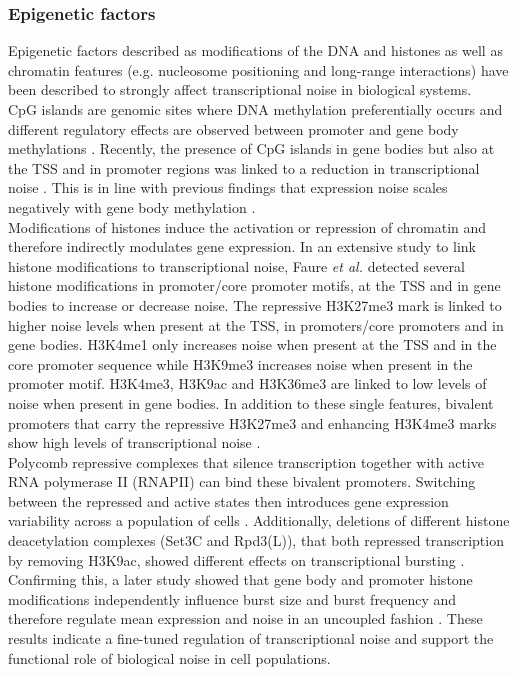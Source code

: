 \subsubsection{Epigenetic factors}
\label{sec0:epigenetic}

Epigenetic factors described as modifications of the DNA and histones as well as chromatin features (e.g. nucleosome positioning and long-range interactions) have been described to strongly affect transcriptional noise in biological systems. \\
CpG islands are genomic sites where DNA methylation preferentially occurs and different regulatory effects are observed between promoter and gene body methylations .  Recently, the presence of CpG islands in gene bodies but also at the TSS and in promoter regions was linked to a reduction in transcriptional noise \citep{Faure2017}. This is in line with previous findings that expression noise scales negatively with gene body methylation \cite{Huh2013}.\\
Modifications of histones induce the activation or repression of chromatin and  therefore indirectly modulates gene expression\citep{Suganuma2011}. In an extensive study to link histone modifications to transcriptional noise, Faure \textit{et al.} detected several histone modifications in promoter/core promoter motifs, at the TSS and in gene bodies to increase or decrease noise.  The repressive H3K27me3 mark is linked to higher noise levels when present at the TSS, in promoters/core promoters and in gene bodies. H3K4me1 only increases noise when present at the TSS and in the core promoter sequence while H3K9me3 increases noise when present in the promoter motif. H3K4me3, H3K9ac and H3K36me3 are linked to low levels of noise when present in gene bodies. In addition to these single features, bivalent promoters that carry the repressive H3K27me3 and enhancing H3K4me3 marks show high levels of transcriptional noise \citep{Faure2017}.\\ 
Polycomb repressive complexes that silence transcription together with active RNA polymerase II (RNAPII) can bind these bivalent promoters. Switching between the repressed and active states then introduces gene expression variability across a population of cells \cite{Kar2017}. Additionally, deletions of different histone deacetylation complexes (Set3C and Rpd3(L)), that both repressed transcription by removing H3K9ac, showed different effects on transcriptional bursting \citep{Weinberger2012}.  Confirming this, a later study showed that gene body and promoter histone modifications independently influence burst size and burst frequency and therefore regulate mean expression and noise in an uncoupled fashion \cite{Wu2017}. These results indicate a fine-tuned regulation of transcriptional noise and support the functional role of biological noise in cell populations.\\
